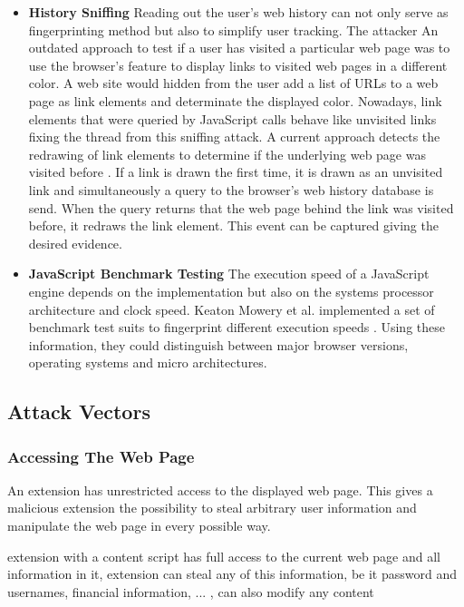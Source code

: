 \begin{itemize}
				\item \textbf{History Sniffing} Reading out the user's web history can not only serve as fingerprinting method but also to simplify user tracking. The attacker  An outdated approach to test if a user has visited a particular web page was to use the browser's feature to display links to visited web pages in a different color. A web site would hidden from the user add a list of URLs to a web page as link elements and determinate the displayed color. Nowadays, link elements that were queried by JavaScript calls behave like unvisited links fixing the thread from this sniffing attack. A current approach detects the redrawing of link elements to determine if the underlying web page was visited before \cite{paulstone_historysniffing}. If a link is drawn the first time, it is drawn as an unvisited link and simultaneously a query to the browser's web history database is send. When the query returns that the web page behind the link was visited before, it redraws the link element. This event can be captured giving the desired evidence.
				
				\item \textbf{JavaScript Benchmark Testing} The execution speed of a JavaScript engine depends on the implementation but also on the systems processor architecture and clock speed. Keaton Mowery et al. implemented a set of benchmark test suits to fingerprint different execution speeds \cite{MBYS11}. Using these information, they could distinguish between major browser versions, operating systems and micro architectures. 
			\end{itemize}
	
	\subsection{Attack Vectors}
	
		\subsubsection{Accessing The Web Page}
			
			An extension has unrestricted access to the displayed web page. This gives a malicious extension the possibility to steal arbitrary user information and manipulate the web page in every possible way. 
			
			\cite{liu2011botnet, Liu12chromeextensions:, extensions:cns14, TerLouw:2007:EWB:1420581.1420583} extension  with a content script has full access to the current web page and all information in it, extension can steal any of this information, be it password and usernames, financial information, ... , can also modify any content \\
	 
